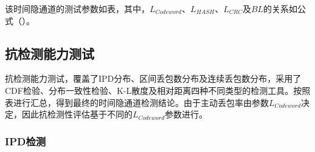 
该时间隐通道的测试参数如表，其中，$L_{Codeword}$、$L_{HASH}$、$L_{CRC}$及$BL$的关系如公式（）。

\subsection{抗检测能力测试}
\label{chap:hash:result:undetectability}

抗检测能力测试，覆盖了IPD分布、区间丢包数分布及连续丢包数分布，采用了CDF检验、分布一致性检验、K-L散度及相对距离四种不同类型的检测工具。按照表进行汇总，得到最终的时间隐通道检测结论。由于主动丢包率由参数$L_{Codeword}$决定，因此抗检测性评估基于不同的$L_{Codeword}$参数进行。

\subsubsection{IPD检测}
\label{chap:hash:result:undetectability:ipd}

